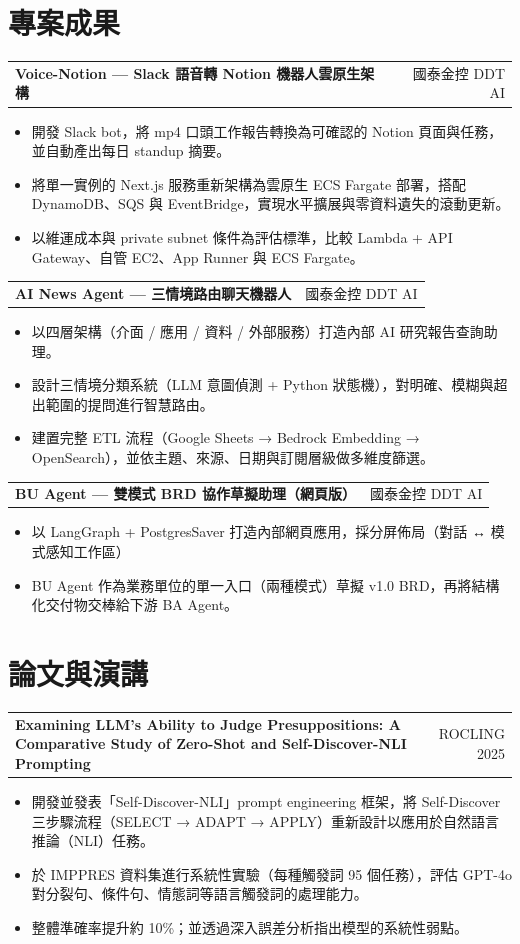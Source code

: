 \documentclass[11pt,a4paper]{article}
\makeatletter
\newcommand{\arrowright}{{\symbolfont →}}
\newcommand{\arrowboth}{{\symbolfont ↔}}
\newcommand{\arrowright}{\ensuremath{\rightarrow}}
\newcommand{\arrowboth}{\ensuremath{\leftrightarrow}}
\newcommand{\entryhead}[2]{%
  \begin{tabularx}{\linewidth}{@{}Xr@{}}
    \textbf{\fontsize{10.5pt}{13pt}\selectfont #1} &
    {\color{inkmuted}\fontsize{9.5pt}{12pt}\selectfont #2}
  \end{tabularx}%
}
\makeatother
\begin{document}
\section{專案成果}
\entryhead{Voice-Notion — Slack 語音轉 Notion 機器人雲原生架構}{國泰金控 DDT AI}
\begin{itemize}
  \item 開發 Slack bot，將 mp4 口頭工作報告轉換為可確認的 Notion 頁面與任務，並自動產出每日 standup 摘要。
  \item 將單一實例的 Next.js 服務重新架構為雲原生 ECS Fargate 部署，搭配 DynamoDB、SQS 與 EventBridge，實現水平擴展與零資料遺失的滾動更新。
  \item 以維運成本與 private subnet 條件為評估標準，比較 Lambda + API Gateway、自管 EC2、App Runner 與 ECS Fargate。
\end{itemize}
\vspace{2.6mm}\entryhead{AI News Agent — 三情境路由聊天機器人}{國泰金控 DDT AI}
\begin{itemize}
  \item 以四層架構（介面 / 應用 / 資料 / 外部服務）打造內部 AI 研究報告查詢助理。
  \item 設計三情境分類系統（LLM 意圖偵測 + Python 狀態機），對明確、模糊與超出範圍的提問進行智慧路由。
  \item 建置完整 ETL 流程（Google Sheets \arrowright{} Bedrock Embedding \arrowright{} OpenSearch），並依主題、來源、日期與訂閱層級做多維度篩選。
\end{itemize}
\vspace{2.6mm}\entryhead{BU Agent — 雙模式 BRD 協作草擬助理（網頁版）}{國泰金控 DDT AI}
\begin{itemize}
  \item 以 LangGraph + PostgresSaver 打造內部網頁應用，採分屏佈局（對話 \arrowboth{} 模式感知工作區）
  \item BU Agent 作為業務單位的單一入口（兩種模式）草擬 v1.0 BRD，再將結構化交付物交棒給下游 BA Agent。
\end{itemize}

\section{論文與演講}
\entryhead{Examining LLM's Ability to Judge Presuppositions: A Comparative Study of Zero-Shot and Self-Discover-NLI Prompting}{ROCLING 2025}
\begin{itemize}
  \item 開發並發表「Self-Discover-NLI」prompt engineering 框架，將 Self-Discover 三步驟流程（SELECT \arrowright{} ADAPT \arrowright{} APPLY）重新設計以應用於自然語言推論（NLI）任務。
  \item 於 IMPPRES 資料集進行系統性實驗（每種觸發詞 95 個任務），評估 GPT-4o 對分裂句、條件句、情態詞等語言觸發詞的處理能力。
  \item 整體準確率提升約 10\%；並透過深入誤差分析指出模型的系統性弱點。
\end{itemize}
\end{document}
